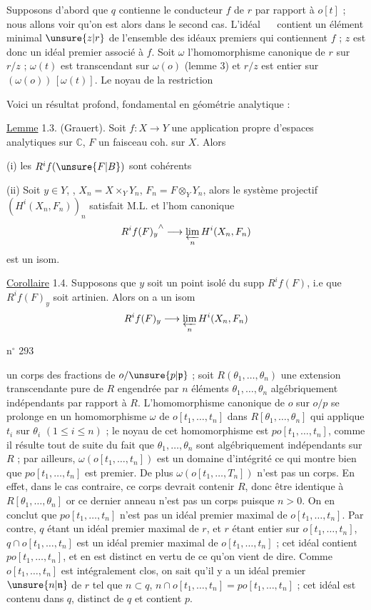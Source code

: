 Supposons d'abord que $q$ contienne le conducteur $f$ de $r$ par rapport à $o[t]$ ; nous allons voir qu'on est alors dans le second cas. L'idéal $\quad$ contient un élément minimal $\unsure{z|r}$ de l'ensemble des idéaux premiers qui contiennent $f$ ; $z$ est donc un idéal premier associé à $f$. Soit $\omega$ l'homomorphisme canonique de $r$ sur $r/z$ ; $\omega(t)$ est transcendant sur $\omega(o)$ (lemme 3) et $r/z$ est entier sur $(\omega(o))\,[\omega(t)]$. Le noyau de la restriction

Voici un résultat  profond, fondamental  en géométrie analytique :

\uline{Lemme} 1.3. (Grauert). Soit $f:X\longrightarrow Y$ une application propre d'espaces analytiques sur $\mathbb C$, $F$ un faisceau coh. sur $X$. Alors

(i) les $R^if(\unsure{F|B})$ sont cohérents

(ii) Soit $y\in Y$, , $X_n=X\times_Y Y_n$, $F_n=F\otimes_Y Y_n$, alors le système projectif $(H^i(X_n,F_n))_n$ satisfait M.L. et l'hom canonique
\[
{R^if(F)_y}^{\wedge}\longrightarrow\varprojlim_n H^i(X_n,F_n)
\]
est un isom.

\uline{Corollaire} 1.4. Supposons que $y$ soit un point isolé du supp $R^if(F)$,  i.e que $R^if(F)_y$ soit artinien. Alors on a un isom
\[
R^if(F)_y\longrightarrow\varprojlim_n H^i(X_n,F_n)
\]

\hfill n$^\circ$ 293

un corps des fractions de $o/\unsure{p|\mathfrak p}$ ; soit $R(\theta_1,\ldots,\theta_n)$ une extension transcendante pure de $R$ engendrée par $n$ éléments $\theta_1,\ldots,\theta_n$ algébriquement indépendants par rapport à $R$. L'homomorphisme canonique de $o$ sur $o/p$ se prolonge en un homomorphisme $\omega$ de $o[t_1,\ldots,t_n]$ dans $R[\theta_1,\ldots,\theta_n]$ qui applique $t_i$ sur $\theta_i$ $(1\leq i\leq n)$ ; le noyau de cet homomorphisme est $po[t_1,\ldots,t_n]$, comme il résulte tout de suite du fait que $\theta_1,\ldots,\theta_n$ sont algébriquement indépendants sur $R$ ; par ailleurs, $\omega(o[t_1,\ldots,t_n])$ est un domaine d'intégrité ce qui montre bien que $po[t_1,\ldots,t_n]$ est premier. De plus $\omega(o[t_1,\ldots,T_n])$ n'est pas un corps. En effet, dans le cas contraire, ce corps devrait contenir $R$, donc être identique à $R[\theta_1,\ldots,\theta_n]$ or ce dernier anneau n'est pas un corps puisque $n>0$. On en conclut que $po[t_1,\ldots,t_n]$ n'est pas un idéal premier maximal de $o[t_1,\ldots,t_n]$. Par contre, $q$ étant un idéal premier maximal de $r$, et $r$ étant entier sur $o[t_1,\ldots,t_n]$, $q\cap o[t_1,\ldots,t_n]$ est un idéal premier maximal de $o[t_1,\ldots,t_n]$ ; cet idéal contient $po[t_1,\ldots,t_n]$, et en est distinct en vertu de ce qu'on vient de dire. Comme $o[t_1,\ldots,t_n]$ est intégralement clos, on sait qu'il y a un idéal premier $\unsure{n|\mathfrak n}$ de $r$ tel que $n\subset q$, $n\cap o[t_1,\ldots,t_n]=po[t_1,\ldots,t_n]$ ; cet idéal est contenu dans $q$, distinct de $q$ et contient $p$.

